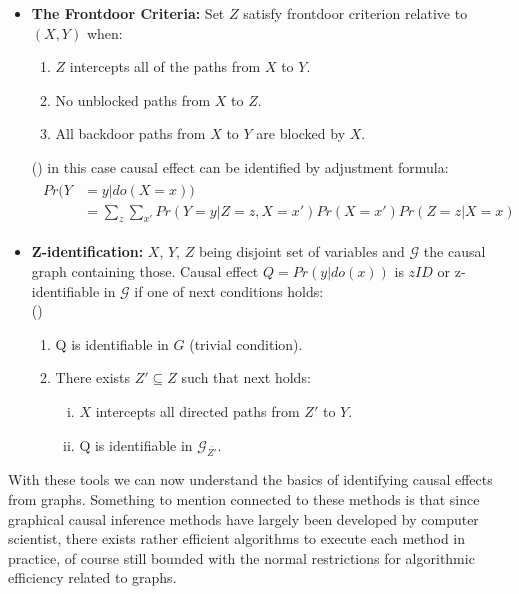 \documentclass[main=english,12pt,a4paper,pdftex,econ,utf8]{aaltothesis}
\newcommand{\g}{\mathcal{G}}
\begin{document}
\begin{itemize}
    \item[] \textbf{The Frontdoor Criteria:} Set $Z$ satisfy frontdoor criterion relative to $(X,Y)$ when:
    \begin{enumerate}
        \item $Z$ intercepts all of the paths from $X$ to $Y$.
        \item No unblocked paths from $X$ to $Z$.
        \item All backdoor paths from $X$ to $Y$ are blocked by $X$.
    \end{enumerate}
    \vspace{-.2cm}
    (\cite{Pearl2016})
    in this case causal effect can be identified by adjustment formula:
    \begin{align} \label{eq:fd}
        \begin{split}
            Pr(Y&=y|do(X=x)) \\ 
            &=\sum_{z}\sum_{x'}Pr(Y=y|Z=z,X=x')Pr(X=x')Pr(Z=z|X=x)
        \end{split}
    \end{align}
    \item[] \textbf{Z-identification:} $X$, $Y$, $Z$ being disjoint set of variables and $\g$ the causal graph containing those. Causal effect $Q=Pr(y|do(x))$ is $zID$ or z-identifiable in $\g$ if one of next conditions holds: \\
    (\cite{Bareinboim2012})
    \begin{enumerate}
        \item Q is identifiable in $G$ (trivial condition).
        \item There exists $Z'\subseteq Z$ such that next holds:
        \begin{enumerate}[i.]
            \item $X$ intercepts all directed paths from $Z'$ to $Y$.
            \item Q is identifiable in $\g_{\overline{Z'}}$.
        \end{enumerate}
    \end{enumerate}
\end{itemize}

\noindent With these tools we can now understand the basics of identifying causal effects from graphs. Something to mention connected to these methods is that since graphical causal inference methods have largely been developed by computer scientist, there exists rather efficient algorithms to execute each method in practice, of course still bounded with the normal restrictions for algorithmic efficiency related to graphs.
\end{document}

